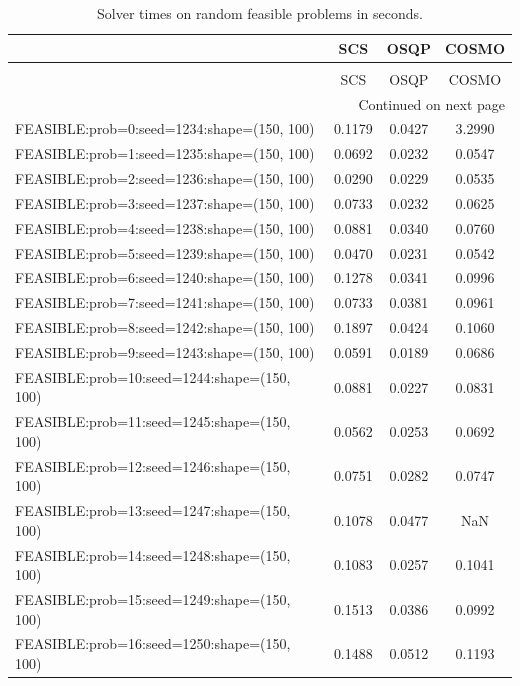 \begin{longtable}{lccc}
\caption{Solver times on random feasible problems in seconds.}
\label{t-random feasible-results}\\
\toprule
{} &    SCS &   OSQP &  COSMO \\
\midrule
\endfirsthead
\caption[]{Solver times on random feasible problems in seconds.} \\
\toprule
{} &    SCS &   OSQP &  COSMO \\
\midrule
\endhead
\midrule
\multicolumn{4}{r}{{Continued on next page}} \\
\midrule
\endfoot

\bottomrule
\endlastfoot
FEASIBLE:prob=0:seed=1234:shape=(150, 100)   & 0.1179 & 0.0427 & 3.2990 \\
FEASIBLE:prob=1:seed=1235:shape=(150, 100)   & 0.0692 & 0.0232 & 0.0547 \\
FEASIBLE:prob=2:seed=1236:shape=(150, 100)   & 0.0290 & 0.0229 & 0.0535 \\
FEASIBLE:prob=3:seed=1237:shape=(150, 100)   & 0.0733 & 0.0232 & 0.0625 \\
FEASIBLE:prob=4:seed=1238:shape=(150, 100)   & 0.0881 & 0.0340 & 0.0760 \\
FEASIBLE:prob=5:seed=1239:shape=(150, 100)   & 0.0470 & 0.0231 & 0.0542 \\
FEASIBLE:prob=6:seed=1240:shape=(150, 100)   & 0.1278 & 0.0341 & 0.0996 \\
FEASIBLE:prob=7:seed=1241:shape=(150, 100)   & 0.0733 & 0.0381 & 0.0961 \\
FEASIBLE:prob=8:seed=1242:shape=(150, 100)   & 0.1897 & 0.0424 & 0.1060 \\
FEASIBLE:prob=9:seed=1243:shape=(150, 100)   & 0.0591 & 0.0189 & 0.0686 \\
FEASIBLE:prob=10:seed=1244:shape=(150, 100)  & 0.0881 & 0.0227 & 0.0831 \\
FEASIBLE:prob=11:seed=1245:shape=(150, 100)  & 0.0562 & 0.0253 & 0.0692 \\
FEASIBLE:prob=12:seed=1246:shape=(150, 100)  & 0.0751 & 0.0282 & 0.0747 \\
FEASIBLE:prob=13:seed=1247:shape=(150, 100)  & 0.1078 & 0.0477 &    NaN \\
FEASIBLE:prob=14:seed=1248:shape=(150, 100)  & 0.1083 & 0.0257 & 0.1041 \\
FEASIBLE:prob=15:seed=1249:shape=(150, 100)  & 0.1513 & 0.0386 & 0.0992 \\
FEASIBLE:prob=16:seed=1250:shape=(150, 100)  & 0.1488 & 0.0512 & 0.1193 \\

\end{longtable}
